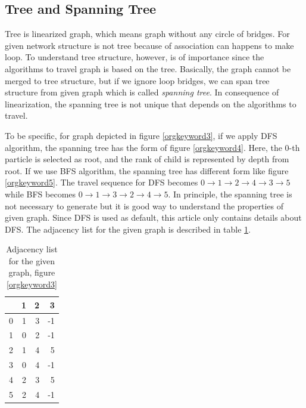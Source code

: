 \documentclass[11pt]{article}
\begin{document}
\subsection{Tree and Spanning Tree}
\label{sec:orgheadline15}
Tree is linearized graph, which means graph without any circle of bridges. For given network structure is not tree because of association can happens to make loop. To understand tree structure, however, is of importance since the algorithms to travel graph is based on the tree. Basically, the graph cannot be merged to tree structure, but if we ignore loop bridges, we can span tree structure from given graph which is called \emph{spanning tree}. In consequence of linearization, the spanning tree is not unique that depends on the algorithms to travel. 

To be specific, for graph depicted in figure \ref{orgkeyword3}, if we apply DFS algorithm, the spanning tree has the form of figure \ref{orgkeyword4}. Here, the 0-th particle is selected as root, and the rank of child is represented by depth from root. If we use BFS algorithm, the spanning tree has different form like figure \ref{orgkeyword5}. The travel sequence for DFS becomes \(0\to 1\to 2\to 4\to 3\to 5\) while BFS becomes \(0\to 1\to 3\to 2\to 4\to 5\). In principle, the spanning tree is not necessary to generate but it is good way to understand the properties of given graph. Since DFS is used as default, this article only contains details about DFS. The adjacency list for the given graph is described in table \ref{tab:orgtable5}.

\begin{table}[htb]
\caption{\label{tab:orgtable5}
Adjacency list for the given graph, figure \ref{orgkeyword3}}
\centering
\begin{tabular}{rrrr}
 & 1 & 2 & 3\\
\hline
0 & 1 & 3 & -1\\
1 & 0 & 2 & -1\\
2 & 1 & 4 & 5\\
3 & 0 & 4 & -1\\
4 & 2 & 3 & 5\\
5 & 2 & 4 & -1\\
\hline
\end{tabular}
\end{table}
\end{document}
